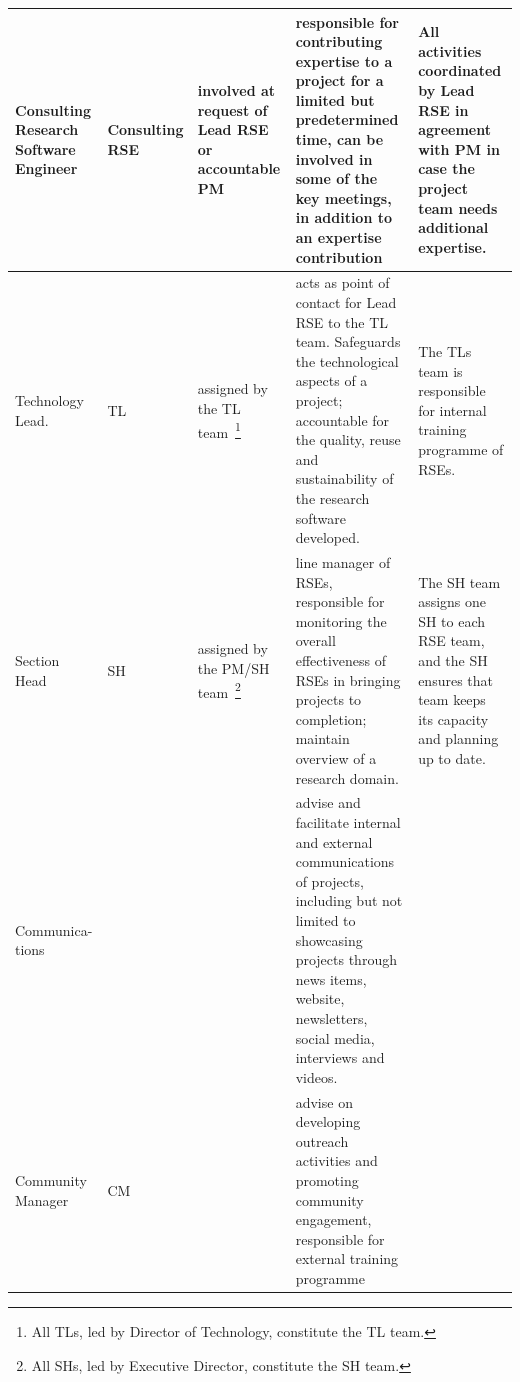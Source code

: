 \begin{tabularx}{\linewidth}{p{}|p{}|p{}|p{}|p{}}
Consulting Research Software Engineer              & Consulting RSE        & involved at request of Lead RSE or accountable PM                                                                 & responsible for contributing expertise to a project for a limited but predetermined time, can be involved in some of the key meetings, in addition to an expertise contribution                                                        & All activities coordinated by Lead RSE in agreement with PM in case the project team needs additional expertise.                     \\\hline
Technology Lead.                                    & TL                    & assigned by the TL team~\footnote{All TLs, led by Director of Technology, constitute the TL team.}                & acts as point of contact for Lead RSE to the TL team. Safeguards the technological aspects of a project; accountable for the quality, reuse and sustainability of the research software developed.                                     & The TLs team is responsible for internal training programme of RSEs.                                                                 \\\hline
Section Head                                       & SH                    & assigned by the PM/SH team~\footnote{All SHs, led by Executive Director, constitute the SH team.}                 & line manager of RSEs, responsible for monitoring the overall effectiveness of RSEs in bringing projects to completion; maintain overview of a research domain.                                                                         & The SH team assigns one SH to each RSE team, and the SH ensures that team keeps its capacity and planning up to date.                \\\hline
Communica-tions                                     &                       &                                                                                                                   & advise and facilitate internal and external communications of projects, including but not limited to showcasing projects through news items, website, newsletters, social media, interviews and videos.                                &                                                                                                                                      \\\hline
Community Manager                                  & CM                    &                                                                                                                   & advise on developing outreach activities and promoting community engagement, responsible for external training programme                                                                                                               &                                                                                                                                      \\\hline

\end{tabularx}
